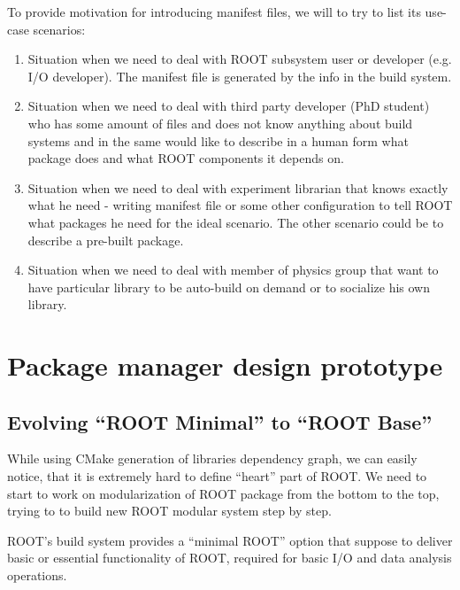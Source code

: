 \documentclass{webofc}
\begin{document}
To provide motivation for introducing manifest files, we will to try to list its use-case scenarios:
\begin{enumerate}
\item Situation when we need to deal with ROOT subsystem user or developer (e.g. I/O developer). The manifest file is generated by the info in the build system.
\item Situation when we need to deal with third party developer (PhD student) who has some amount of files and does not know anything about build systems and in the same would like to describe in a human form what package does and what ROOT components it depends on.
\item Situation when we need to deal with experiment librarian that knows exactly what he need - writing manifest file or some other configuration to tell ROOT what packages he need for the ideal scenario. The other scenario could be to describe a pre-built package.
\item Situation when we need to deal with member of physics group that want to have particular library to be auto-build on demand or to socialize his own library.
\end{enumerate}



\section{Package manager design prototype}

\subsection{Evolving “ROOT Minimal” to “ROOT Base”}

While using CMake generation of libraries dependency graph, we can easily notice, that it is extremely hard to define “heart” part of ROOT. We need to start to work on modularization of ROOT package from the bottom to the top, trying to to build new ROOT modular system step by step.

ROOT’s build system provides a “minimal ROOT” option that suppose to deliver basic or essential functionality of ROOT, required for basic I/O and data analysis operations.
\end{document}
